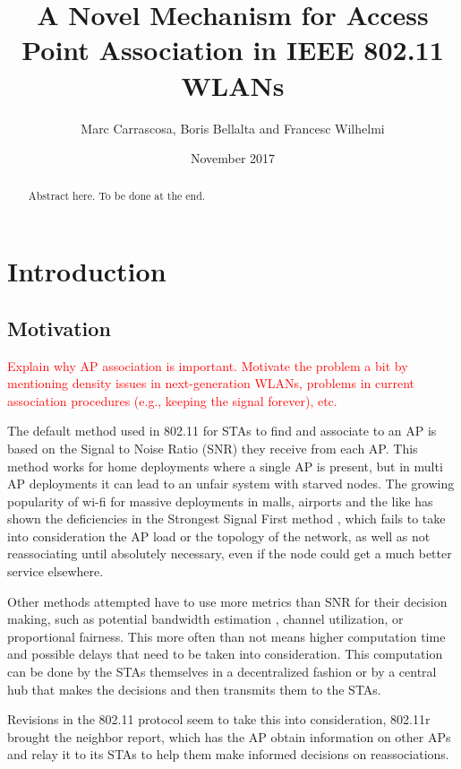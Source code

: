 \documentclass{article}
\title{A Novel Mechanism for Access Point Association in IEEE 802.11 WLANs}
\author{Marc Carrascosa, Boris Bellalta and Francesc Wilhelmi}
\date{November 2017}
\begin{document}
\maketitle

\begin{abstract}
	Abstract here. To be done at the end.
\end{abstract}

\tableofcontents
\newpage
\section{Introduction}
\label{section:introduction}
	
	\subsection{Motivation}
	\label{section:motivation}
		\textcolor{red}{Explain why AP association is important. Motivate the problem a bit by mentioning density issues in next-generation WLANs, problems in current association procedures (e.g., keeping the signal forever), etc.}

	The default method used in 802.11 for STAs to find and associate to an AP is based on the Signal to Noise Ratio (SNR) they receive from each AP. This method works for home deployments where a single AP is present, but in multi AP deployments it can lead to an unfair system with starved nodes. The growing popularity of wi-fi for massive deployments in malls, airports and the like has shown the deficiencies in the Strongest Signal First method \cite{judd2004}\cite{anand2002}, which fails to take into consideration the AP load or the topology of the network, as well as not reassociating until absolutely necessary, even if the node could get a much better service elsewhere.
	
	Other methods attempted have to use more metrics than SNR for their decision making, such as potential bandwidth estimation \cite{vasudevan2005}, channel utilization, or proportional fairness. This more often than not means higher computation time and possible delays that need to be taken into consideration. This computation can be done by the STAs themselves in a decentralized fashion or by a central hub that makes the decisions and then transmits them to the STAs. 
	
	
	Revisions in the 802.11 protocol seem to take this into consideration, 802.11r brought the neighbor report, which has the AP obtain information on other APs and relay it to its STAs to help them make informed decisions on reassociations. 
	
\end{document}

